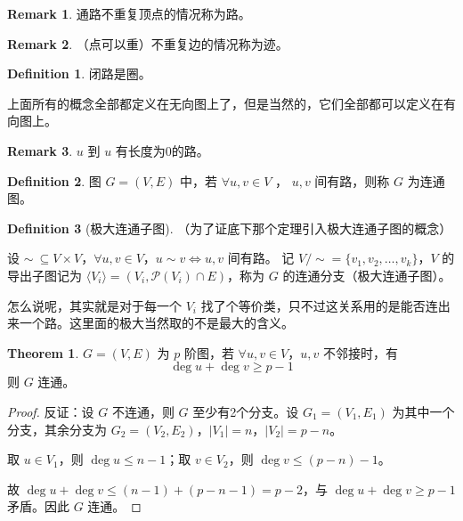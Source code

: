 \documentclass[oneside]{book}
\theoremstyle{definition}
\newtheorem{definition}{Definition}[section]
\newtheorem{theorem}{Theorem}[section]
\newtheorem{remark}{Remark}[section]
\begin{document}
\begin{remark}
	通路不重复顶点的情况称为路。
\end{remark}
\begin{remark}
	（点可以重）不重复边的情况称为迹。
\end{remark}
\begin{definition}
	闭路是圈。
\end{definition}
上面所有的概念全部都定义在无向图上了，但是当然的，它们全部都可以定义在有向图上。
\begin{remark}
	\(u\) 到 \(u \) 有长度为0的路。
\end{remark}
\begin{definition}
	图 \( G=(V,E) \) 中，若 \( \forall u,v \in V \) ， \( u,v \) 间有路，则称 \( G \) 为连通图。
\end{definition}
\begin{definition}[极大连通子图]
	（为了证底下那个定理引入极大连通子图的概念）
	
	设 \( \sim\ \subseteq V \times V \)，\( \forall u,v \in V \)，\( u \sim v \iff u,v \) 间有路。
	记 \( V/\sim = \{v_1,v_2,\dots,v_k\} \)，\( V \) 的导出子图记为 \( \langle V_i \rangle = (V_i, \mathscr{P}(V_i) \cap E) \)，称为 \( G \) 的连通分支（极大连通子图）。
\end{definition}
怎么说呢，其实就是对于每一个 \(V_i\) 找了个等价类，只不过这关系用的是能否连出来一个路。这里面的极大当然取的不是最大的含义。
\begin{theorem}
	\( G=(V,E) \) 为 \( p \) 阶图，若 \( \forall u,v \in V \)，\( u,v \) 不邻接时，有
	\[
	\deg u + \deg v \geq p-1
	\]
	则 \( G \) 连通。
\end{theorem}
\begin{proof}
	反证：设 \( G \) 不连通，则 \( G \) 至少有2个分支。设 \( G_1=(V_1,E_1) \) 为其中一个分支，其余分支为 \( G_2=(V_2,E_2) \)，\( |V_1|=n \)，\( |V_2|=p-n \)。
	
	取 \( u \in V_1 \)，则 \( \deg u \leq n-1 \)；取 \( v \in V_2 \)，则 \( \deg v \leq (p-n)-1 \)。
	
	故 \( \deg u + \deg v \leq (n-1)+(p-n-1)=p-2 \)，与 \( \deg u + \deg v \geq p-1 \) 矛盾。因此 \( G \) 连通。
\end{proof}
\end{document}
